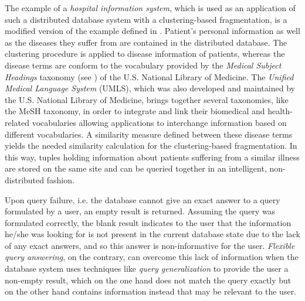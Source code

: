 The example of a \emph{hospital information system}, which is used as an application of such a distributed database system with a clustering-based 
fragmentation, is a modified version of the example defined in \citet{Wiese2014}. Patient's personal information as well as the diseases they suffer from are 
contained in the distributed database. The clustering procedure is applied to disease information of patients, whereas the disease terms are conform to the 
vocabulary provided by the \emph{Medical Subject Headings} taxonomy (see ) of the U.S. National Library of Medicine. 
The \emph{Unified Medical Language System} (UMLS), which was also developed and maintained by the U.S. National Library of Medicine, brings together several 
taxonomies, like the MeSH taxonomy, in order to integrate and link their biomedical and health-related vocabularies allowing applications to interchange
information based on different vocabularies.
A similarity measure defined between these disease terms yields the needed similarity calculation for the clustering-based fragmentation. In this way,
tuples holding information about patients suffering from a similar illness are stored on the same site and can be queried together in an intelligent, 
non-distributed fashion.


Upon query failure, i.e. the database cannot give an exact answer to a query formulated by a user, an empty result is returned. Assuming the query was 
formulated correctly, the blank result indicates to the user that the information he/she was looking for is not present in the current database state due to
the lack of any exact answers, and so this answer is non-informative for the user. \emph{Flexible query answering}, on the contrary, can overcome this lack of
information when the database system uses techniques like \emph{query generalization} to provide the user a non-empty result, which on the one hand does not 
match the query exactly but on the other hand contains information instead that may be relevant to the user. 


